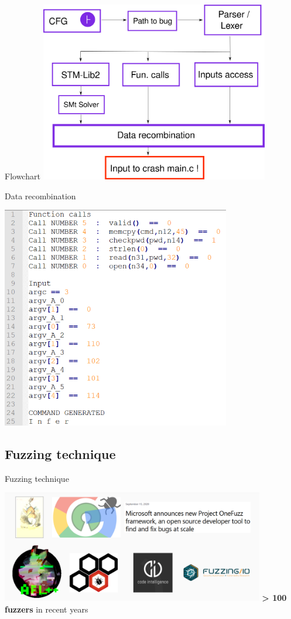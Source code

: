 \documentclass{beamer}
\begin{document}
\begin{frame}{Flowchart}
\includegraphics[width=10cm]{Figures/SMTsolver/SMTsolverCompete.png}
\end{frame}

\begin{frame}{Data recombination}

\includegraphics[width=10cm]{Figures/SMTsolver/Reports.png}

\end{frame}

\subsection{Fuzzing technique}

\begin{frame}{Fuzzing technique}

\includegraphics[width=11.5cm]{Figures/Fuzzing/graph1.png}
\centering\textbf{> 100 fuzzers} in recent years
\end{frame}
\end{document}
